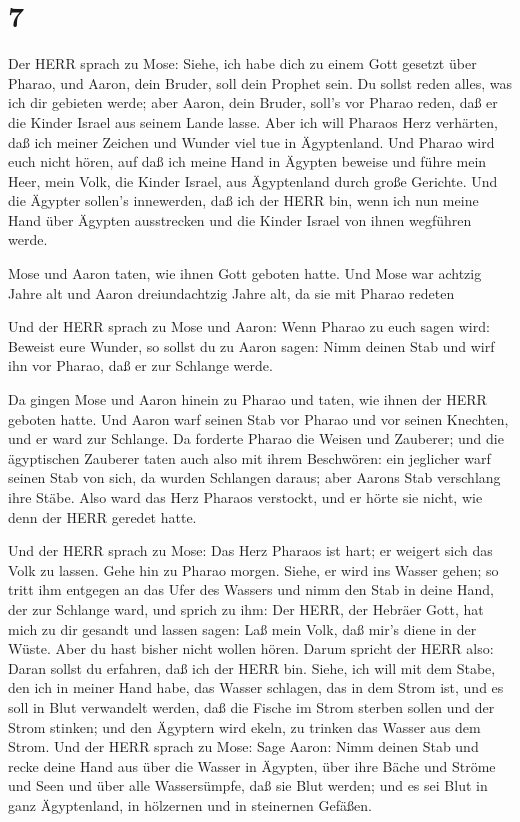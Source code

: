 \hypertarget{section-6}{%
\section{7}\label{section-6}}

 Der HERR sprach zu Mose: Siehe, ich habe dich zu einem Gott
gesetzt über Pharao, und Aaron, dein Bruder, soll dein Prophet sein.
 Du sollst reden alles, was ich dir gebieten werde; aber
Aaron, dein Bruder, soll's vor Pharao reden, daß er die Kinder Israel
aus seinem Lande lasse.  Aber ich will Pharaos Herz
verhärten, daß ich meiner Zeichen und Wunder viel tue in Ägyptenland.
 Und Pharao wird euch nicht hören, auf daß ich meine Hand in
Ägypten beweise und führe mein Heer, mein Volk, die Kinder Israel, aus
Ägyptenland durch große Gerichte.  Und die Ägypter sollen's
innewerden, daß ich der HERR bin, wenn ich nun meine Hand über Ägypten
ausstrecken und die Kinder Israel von ihnen wegführen werde.

 Mose und Aaron taten, wie ihnen Gott geboten hatte.
 Und Mose war achtzig Jahre alt und Aaron dreiundachtzig
Jahre alt, da sie mit Pharao redeten

 Und der HERR sprach zu Mose und Aaron:  Wenn
Pharao zu euch sagen wird: Beweist eure Wunder, so sollst du zu Aaron
sagen: Nimm deinen Stab und wirf ihn vor Pharao, daß er zur Schlange
werde.

 Da gingen Mose und Aaron hinein zu Pharao und taten, wie
ihnen der HERR geboten hatte. Und Aaron warf seinen Stab vor Pharao und
vor seinen Knechten, und er ward zur Schlange.  Da forderte
Pharao die Weisen und Zauberer; und die ägyptischen Zauberer taten auch
also mit ihrem Beschwören:  ein jeglicher warf seinen Stab
von sich, da wurden Schlangen daraus; aber Aarons Stab verschlang ihre
Stäbe.  Also ward das Herz Pharaos verstockt, und er hörte
sie nicht, wie denn der HERR geredet hatte.

 Und der HERR sprach zu Mose: Das Herz Pharaos ist hart; er
weigert sich das Volk zu lassen.  Gehe hin zu Pharao
morgen. Siehe, er wird ins Wasser gehen; so tritt ihm entgegen an das
Ufer des Wassers und nimm den Stab in deine Hand, der zur Schlange ward,
 und sprich zu ihm: Der HERR, der Hebräer Gott, hat mich zu
dir gesandt und lassen sagen: Laß mein Volk, daß mir's diene in der
Wüste. Aber du hast bisher nicht wollen hören.  Darum
spricht der HERR also: Daran sollst du erfahren, daß ich der HERR bin.
Siehe, ich will mit dem Stabe, den ich in meiner Hand habe, das Wasser
schlagen, das in dem Strom ist, und es soll in Blut verwandelt werden,
 daß die Fische im Strom sterben sollen und der Strom
stinken; und den Ägyptern wird ekeln, zu trinken das Wasser aus dem
Strom.  Und der HERR sprach zu Mose: Sage Aaron: Nimm
deinen Stab und recke deine Hand aus über die Wasser in Ägypten, über
ihre Bäche und Ströme und Seen und über alle Wassersümpfe, daß sie Blut
werden; und es sei Blut in ganz Ägyptenland, in hölzernen und in
steinernen Gefäßen.


